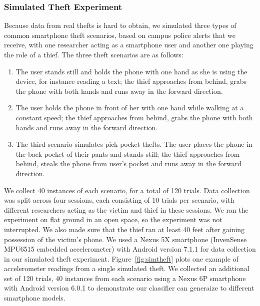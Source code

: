 \subsubsection{Simulated Theft Experiment}
Because data from real thefts is hard to obtain, we simulated three types of common smartphone theft scenarios, based on campus police alerts that we receive, with one researcher acting as a smartphone user and another one playing the role of a thief.
The three theft scenarios are as follows:
\begin{enumerate}
\item The user stands still and holds the phone with one hand as she is using the device, for instance reading a text; the thief approaches from behind, grabs the phone with both hands and runs away in the forward direction.
\item The user holds the phone in front of her with one hand while walking at a constant speed; the thief approaches from behind, grabs the phone with both hands and runs away in the forward direction.
\item The third scenario simulates pick-pocket thefts. The user places the phone in the back pocket of their pants and stands still; the thief approaches from behind, steals the phone from user's pocket and runs away in the forward direction.
\end{enumerate}
We collect 40 instances of each scenario, for a total of 120 trials.
Data collection was split across four sessions, each consisting of 10 trials per scenario, with different researchers acting as the victim and thief in these sessions.
We ran the experiment on flat ground in an open space, so the experiment was not interrupted.
We also made sure that the thief ran at least 40 feet after gaining possession of the victim's phone.
We used a Nexus 5X smartphone (InvenSense MPU6515 embedded accelerometer) with Android version 7.1.1 for data collection in our simulated theft experiment.
Figure~\ref{fig:simtheft} plots one example of accelerometer readings from a single simulated theft.
We collected an additional set of 120 trials, 40 instances from each scenario using a Nexus 6P smartphone with Android version 6.0.1 to demonstrate our classifier can generaize to different smartphone models.


